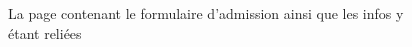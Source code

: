\documentclass{article}[12pt]
\begin{document}
    \begin{figure}[H]
     	\centering
     	\caption{La page contenant le formulaire d'admission ainsi que les infos y étant reliées}
     \end{figure}
\end{document}
